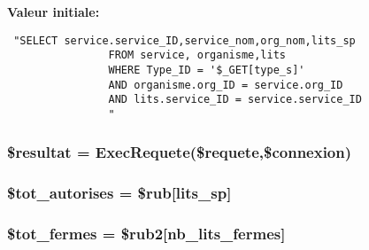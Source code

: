 {\bf Valeur initiale:}

\footnotesize\begin{verbatim} "SELECT service.service_ID,service_nom,org_nom,lits_sp
                FROM service, organisme,lits
                WHERE Type_ID = '$_GET[type_s]'
                AND organisme.org_ID = service.org_ID
                AND lits.service_ID = service.service_ID
                "
\end{verbatim}\normalsize 
\hypertarget{fermeture__regionale_8php_a5}{
\subsubsection[\$resultat]{\setlength{\rightskip}{0pt plus 5cm}\$resultat = Exec\-Requete(\$requete,\$connexion)}}
\label{fermeture__regionale_8php_a5}


\hypertarget{fermeture__regionale_8php_a7}{
\subsubsection[\$tot\_\-autorises]{\setlength{\rightskip}{0pt plus 5cm}\$tot\_\-autorises = \$rub\mbox{[}lits\_\-sp\mbox{]}}}
\label{fermeture__regionale_8php_a7}


\hypertarget{fermeture__regionale_8php_a8}{
\subsubsection[\$tot\_\-fermes]{\setlength{\rightskip}{0pt plus 5cm}\$tot\_\-fermes = \$rub2\mbox{[}nb\_\-lits\_\-fermes\mbox{]}}}
\label{fermeture__regionale_8php_a8}


